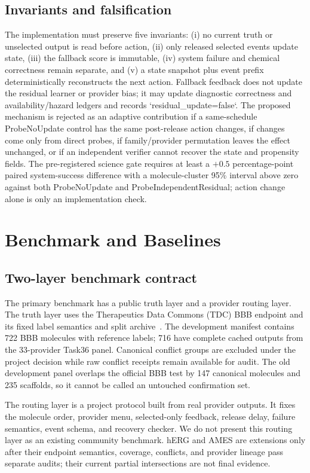 \documentclass[sigconf,anonymous]{aamas}
\begin{document}
\subsection{Invariants and falsification}
The implementation must preserve five invariants: (i) no current truth or unselected output is read before action, (ii) only released selected events update state, (iii) the fallback score is immutable, (iv) system failure and chemical correctness remain separate, and (v) a state snapshot plus event prefix deterministically reconstructs the next action. Fallback feedback does not update the residual learner or provider bias; it may update diagnostic correctness and availability/hazard ledgers and records `residual\_update=false`. The proposed mechanism is rejected as an adaptive contribution if a same-schedule ProbeNoUpdate control has the same post-release action changes, if changes come only from direct probes, if family/provider permutation leaves the effect unchanged, or if an independent verifier cannot recover the state and propensity fields. The pre-registered science gate requires at least a $+0.5$ percentage-point paired system-success difference with a molecule-cluster 95\% interval above zero against both ProbeNoUpdate and ProbeIndependentResidual; action change alone is only an implementation check.

\section{Benchmark and Baselines}
\subsection{Two-layer benchmark contract}
The primary benchmark has a public truth layer and a provider routing layer. The truth layer uses the Therapeutics Data Commons (TDC) BBB endpoint and its fixed label semantics and split archive~\cite{huang2021tdc}. The development manifest contains 722 BBB molecules with reference labels; 716 have complete cached outputs from the 33-provider Task36 panel. Canonical conflict groups are excluded under the project decision while raw conflict receipts remain available for audit. The old development panel overlaps the official BBB test by 147 canonical molecules and 235 scaffolds, so it cannot be called an untouched confirmation set.

The routing layer is a project protocol built from real provider outputs. It fixes the molecule order, provider menu, selected-only feedback, release delay, failure semantics, event schema, and recovery checker. We do not present this routing layer as an existing community benchmark. hERG and AMES are extensions only after their endpoint semantics, coverage, conflicts, and provider lineage pass separate audits; their current partial intersections are not final evidence.
\end{document}
